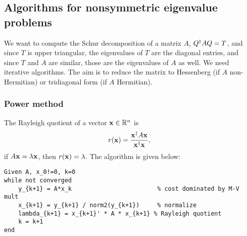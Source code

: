 \documentclass{article}
\begin{document}
\subsection{Algorithms for nonsymmetric eigenvalue problems}
We want to compute the Schur decomposition of a matrix $A$, $Q^{\dagger} AQ=T$, and since $T$ is upper triangular, the eigenvalues of $T$ are the diagonal entries, and since $T$ and $A$ are similar, those are the eigenvalues of $A$ as well. We need iterative algorithms. The aim is to reduce the matrix to Hessenberg (if $A$ non-Hermitian) or tridiagonal form (if $A$ Hermitian).

\subsubsection{Power method}
The Rayleigh quotient of a vector $\bm{\mathrm{x}}\in\mathbb{R}^n$ is 
\begin{equation}
    r(\bm{\mathrm{x}})=\frac{\bm{\mathrm{x}}^{\dagger} A\bm{\mathrm{x}}}{\bm{\mathrm{x}}^{\dagger}\bm{\mathrm{x}}},
\end{equation}
if $A\bm{\mathrm{x}}=\lambda\bm{\mathrm{x}}$, then $r(\bm{\mathrm{x}})=\lambda$. The algorithm is given below:
\begin{verbatim}
Given A, x_0!=0, k=0
while not converged
    y_{k+1} = A*x_k                        % cost dominated by M-V mult
    x_{k+1} = y_{k+1} / norm2(y_{k+1})     % normalize
    lambda_{k+1} = x_{k+1}' * A * x_{k+1} % Rayleigh quotient
    k = k+1
end
\end{verbatim}
\end{document}
